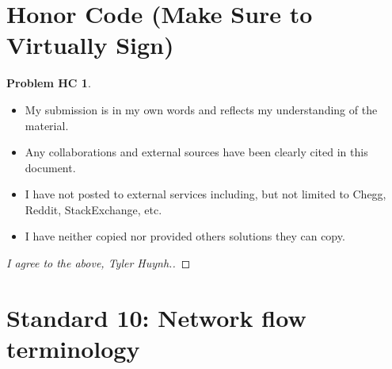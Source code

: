 \documentclass[11pt]{article}
\theoremstyle{definition}
\theoremstyle{definition}
\newtheorem*{requiredHC}{Problem HC}
\theoremstyle{definition}
\begin{document}
\newpage
\section*{Honor Code (Make Sure to Virtually Sign)} \label{HonorCode}
\hypertarget{HonorCode}{}

\begin{requiredHC}
\begin{itemize}
\item My submission is in my own words and reflects my understanding of the material.
\item Any collaborations and external sources have been clearly cited in this document.
\item I have not posted to external services including, but not limited to Chegg, Reddit, StackExchange, etc.
\item I have neither copied nor provided others solutions they can copy.
\end{itemize}

\end{requiredHC}

\begin{proof}[I agree to the above, Tyler Huynh.]
\end{proof}


\newpage
\setcounter{section}{9}
\section{Standard 10: Network flow terminology}
\end{document}
